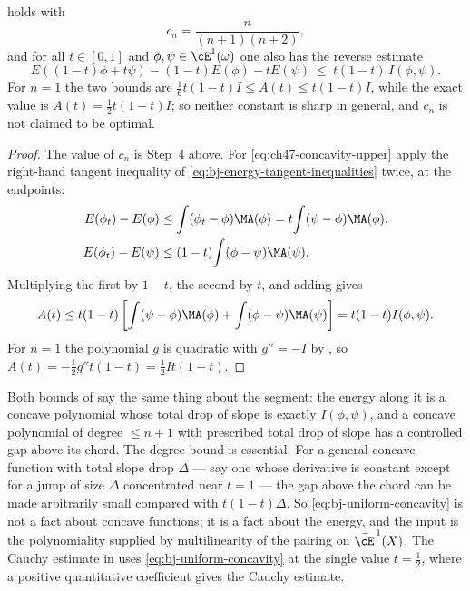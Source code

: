 \begin{corollary}
\label{cor:ch47-concavity-constants}
 holds with
\[
 c_n=\frac{n}{(n+1)(n+2)} ,
\]
and for all $t\in[0,1]$ and $\phi,\psi\in\cE^1(\omega)$ one also has
the reverse estimate
\[
 E((1-t)\phi+t\psi)-(1-t)E(\phi)-tE(\psi)\ \le\ t(1-t)\,I(\phi,\psi).
\tag{47.10}\label{eq:ch47-concavity-upper}
\]
For $n=1$ the two bounds are
$\tfrac16t(1-t)I\le A(t)\le t(1-t)I$, while the exact value is
$A(t)=\tfrac12t(1-t)I$; so neither constant is sharp in general, and
$c_n$ is not claimed to be optimal.
\end{corollary}

\begin{proof}
The value of $c_n$ is Step~4 above.  For \eqref{eq:ch47-concavity-upper}
apply the right-hand tangent inequality of
\eqref{eq:bj-energy-tangent-inequalities} twice, at the endpoints:
\[
 \begin{aligned}
 E(\phi_t)-E(\phi)
   &\le\int(\phi_t-\phi)\MA(\phi)
     =t\!\int(\psi-\phi)\MA(\phi),\\
 E(\phi_t)-E(\psi)
   &\le(1-t)\!\int(\phi-\psi)\MA(\psi).
 \end{aligned}
\]
Multiplying the first by $1-t$, the second by $t$, and adding gives
\[
 A(t)\le t(1-t)\left[\int(\psi-\phi)\MA(\phi)+\int(\phi-\psi)\MA(\psi)\right]
 =t(1-t)I(\phi,\psi).
\]
For $n=1$ the polynomial $g$ is quadratic with $g''=-I$ by
, so
$A(t)=-\tfrac12g''t(1-t)=\tfrac12It(1-t)$.
\end{proof}

\begin{remark}
\label{rem:ch47-concavity-shape}
Both bounds of  say the same thing about
the segment: the energy along it is a concave polynomial whose total drop
of slope is exactly $I(\phi,\psi)$, and a concave polynomial of degree
$\le n+1$ with prescribed total drop of slope has a controlled gap above
its chord.  The degree bound is essential.  For a general concave function
with total slope drop $\Delta$ --- say one whose derivative is constant
except for a jump of size $\Delta$ concentrated near $t=1$ --- the gap
above the chord can be made arbitrarily small compared with
$t(1-t)\Delta$.  So \eqref{eq:bj-uniform-concavity} is not a fact about
concave functions; it is a fact about the energy, and the input is the
polynomiality supplied by multilinearity of the pairing on
$\vec\cE^{\,1}(X)$. The Cauchy estimate in
 uses
\eqref{eq:bj-uniform-concavity} at the single value
$t=\tfrac12$, where a positive quantitative coefficient gives the
Cauchy estimate.
\end{remark}

